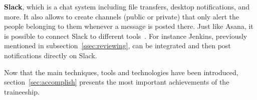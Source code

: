 \textbf{Slack}, which is a chat system including file transfers, desktop notifications, and more. It also allows to create channels (public or private) that only alert the people belonging to them whenever a message is posted there. Just like Asana, it is possible to connect Slack to different tools~\cite{slack}. For instance Jenkins, previously mentioned in {\sc subsection}~\ref{ssec:reviewing}, can be integrated and then post notifications directly on Slack.

Now that the main techniques, tools and technologies have been introduced, {\sc section}~\ref{sec:accomplish} presents the most important achievements of the traineeship.